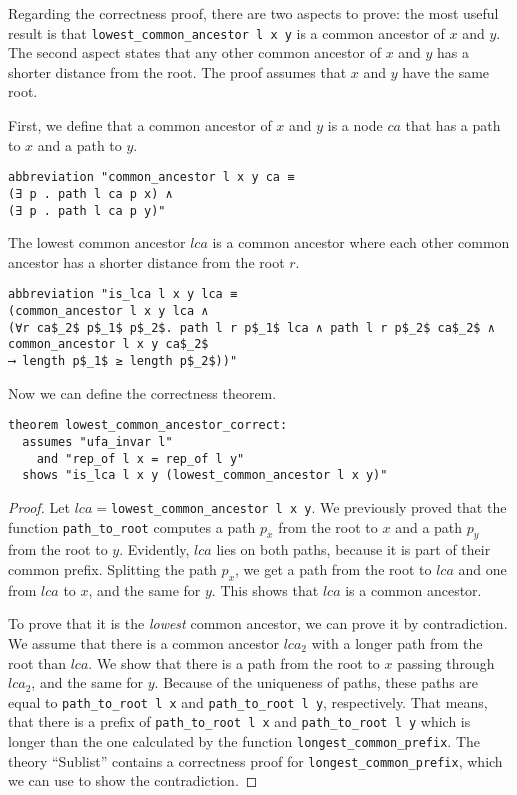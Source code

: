 Regarding the correctness proof, there are two aspects to prove: the most useful result is that \lstinline{lowest_common_ancestor l x y} is a common ancestor of $x$ and $y$. The second aspect states that any other common ancestor of $x$ and $y$ has a shorter distance from the root. The proof assumes that $x$ and $y$ have the same root.

First, we define that a common ancestor of $x$ and $y$ is a node $ca$ that has a path to $x$ and a path to $y$.

\begin{lstlisting}
abbreviation "common_ancestor l x y ca ≡
(∃ p . path l ca p x) ∧
(∃ p . path l ca p y)"
\end{lstlisting}

The lowest common ancestor $lca$ is a common ancestor where each other common ancestor has a shorter distance from the root $r$.

\begin{lstlisting}
abbreviation "is_lca l x y lca ≡
(common_ancestor l x y lca ∧
(∀r ca$_2$ p$_1$ p$_2$. path l r p$_1$ lca ∧ path l r p$_2$ ca$_2$ ∧ common_ancestor l x y ca$_2$
⟶ length p$_1$ ≥ length p$_2$))"
\end{lstlisting}

Now we can define the correctness theorem.

\begin{lstlisting}
theorem lowest_common_ancestor_correct:
  assumes "ufa_invar l"
    and "rep_of l x = rep_of l y"
  shows "is_lca l x y (lowest_common_ancestor l x y)"
\end{lstlisting}

\begin{proof}
Let $lca =$\lstinline{lowest_common_ancestor l x y}. We previously proved that the function \lstinline{path_to_root} computes a path $p_x$ from the root to $x$ and a path $p_y$ from the root to $y$. Evidently, $lca$ lies on both paths, because it is part of their common prefix. Splitting the path $p_x$, we get a path from the root to $lca$ and one from $lca$ to $x$, and the same for $y$. This shows that $lca$ is a common ancestor.

To prove that it is the \emph{lowest} common ancestor, we can prove it by contradiction. We assume that there is a common ancestor $lca_2$ with a longer path from the root than $lca$. We show that there is a path from the root to $x$ passing through $lca_2$, and the same for $y$. Because of the uniqueness of paths, these paths are equal to \lstinline{path_to_root l x} and \lstinline{path_to_root l y}, respectively. That means, that there is a prefix of \lstinline{path_to_root l x} and \lstinline{path_to_root l y} which is longer than the one calculated by the function \lstinline{longest_common_prefix}. The theory ``Sublist'' contains a correctness proof for \lstinline{longest_common_prefix}, which we can use to show the contradiction.
\end{proof}

